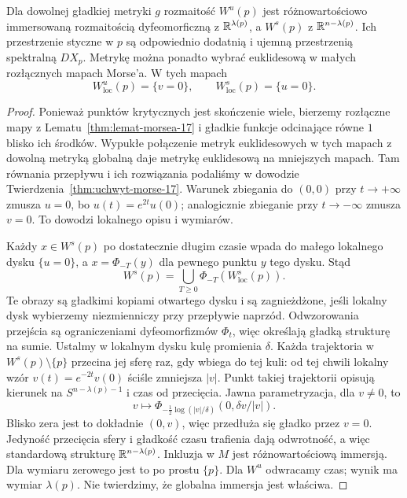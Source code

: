 \begin{twierdzenie}
\label{thm:stable-morse-17}
Dla dowolnej gładkiej metryki $g$ rozmaitość
$W^u(p)$ jest różnowartościowo
immersowaną rozmaitością
dyfeomorficzną z $\mathbb{R}^{\lambda(p)}$,
a $W^s(p)$ z $\mathbb{R}^{n-\lambda(p)}$.
Ich przestrzenie styczne w $p$ są odpowiednio
dodatnią i ujemną przestrzenią spektralną $DX_p$.
Metrykę można ponadto wybrać euklidesową
w małych rozłącznych mapach Morse'a. W tych mapach
\[
 W^u_{\mathrm{loc}}(p)=\{v=0\},
 \qquad
 W^s_{\mathrm{loc}}(p)=\{u=0\}.
\]
\end{twierdzenie}
\begin{proof}
Ponieważ punktów krytycznych
jest skończenie wiele, bierzemy
rozłączne mapy z
Lematu~\ref{thm:lemat-morsea-17}
i gładkie funkcje odcinające
równe $1$ blisko ich środków.
Wypukłe połączenie
metryk euklidesowych w tych
mapach z dowolną metryką
globalną daje metrykę
euklidesową na mniejszych mapach.
Tam równania przepływu
i ich rozwiązania podaliśmy
w dowodzie
Twierdzenia~\ref{thm:uchwyt-morse-17}.
Warunek zbiegania do $(0,0)$
przy $t\to+\infty$ zmusza $u=0$,
bo $u(t)=e^{2t}u(0)$;
analogicznie zbieganie
przy $t\to-\infty$ zmusza $v=0$.
To dowodzi lokalnego opisu
i wymiarów.

Każdy $x\in W^s(p)$
po dostatecznie długim czasie
wpada do małego lokalnego
dysku $\{u=0\}$, a
$x=\Phi_{-T}(y)$
dla pewnego punktu $y$
tego dysku. Stąd
\[
 W^s(p)=\bigcup_{T\geq0}
      \Phi_{-T}(W^s_{\mathrm{loc}}(p)).
\]
Te obrazy są gładkimi kopiami
otwartego dysku i są
zagnieżdżone, jeśli lokalny
dysk wybierzemy niezmienniczy
przy przepływie naprzód.
Odwzorowania przejścia są
ograniczeniami dyfeomorfizmów
$\Phi_t$, więc określają
gładką strukturę na sumie.
Ustalmy w lokalnym dysku
kulę promienia $\delta$.
Każda trajektoria w
$W^s(p)\setminus\{p\}$
przecina jej sferę raz, gdy
wbiega do tej kuli: od tej
chwili lokalny wzór
$v(t)=e^{-2t}v(0)$
ściśle zmniejsza $|v|$.
Punkt takiej trajektorii
opisują kierunek na
$S^{n-\lambda(p)-1}$
i czas od przecięcia.
Jawna parametryzacja, dla $v\ne0$, to
\[
 v\longmapsto
 \Phi_{-\frac12\log(|v|/\delta)}
          (0,\delta v/|v|).
\]
Blisko zera jest to dokładnie $(0,v)$,
więc przedłuża się gładko przez $v=0$.
Jedyność przecięcia sfery i gładkość czasu trafienia
dają odwrotność, a więc standardową
strukturę $\mathbb{R}^{n-\lambda(p)}$.
Inkluzja w $M$ jest
różnowartościową immersją.
Dla wymiaru zerowego
jest to po prostu $\{p\}$.
Dla $W^u$ odwracamy czas;
wynik ma wymiar $\lambda(p)$.
Nie twierdzimy, że globalna
immersja jest właściwa.


\end{proof}
